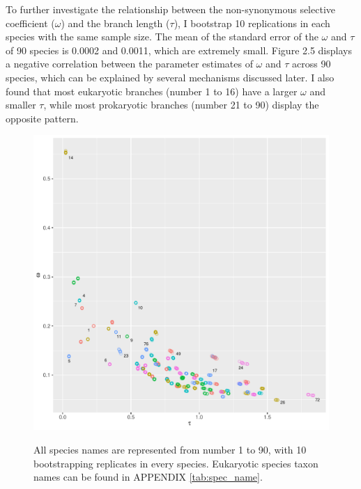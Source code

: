 To further investigate the relationship between the non-synonymous selective coefficient ($\omega$) and the branch length ($\tau$), I bootstrap 10 replications in each species with the same sample size. The mean of the standard error of the $\omega$
and $\tau$ of 90 species is 0.0002 and 0.0011, which are extremely small. Figure 2.5 displays a negative correlation between the parameter estimates of $\omega$ and $\tau$ across 90 species, which can be explained by several mechanisms discussed later.  I also found that most eukaryotic branches (number 1 to 16) have a larger $\omega$ and smaller $\tau$, while most prokaryotic branches (number 21 to 90) display the opposite pattern. 

\begin{figure}[H]
     \begin{minipage}[t]{1\textwidth }
     \centering
     \includegraphics[width=\linewidth]{Fig5.pdf}
     {{All species names are represented from number 1 to 90, with 10 bootstrapping replicates in every species. Eukaryotic species taxon names can be found in APPENDIX \ref{tab:spec_name}.} 
      \par}
     \end{minipage}
\end{figure}
  
